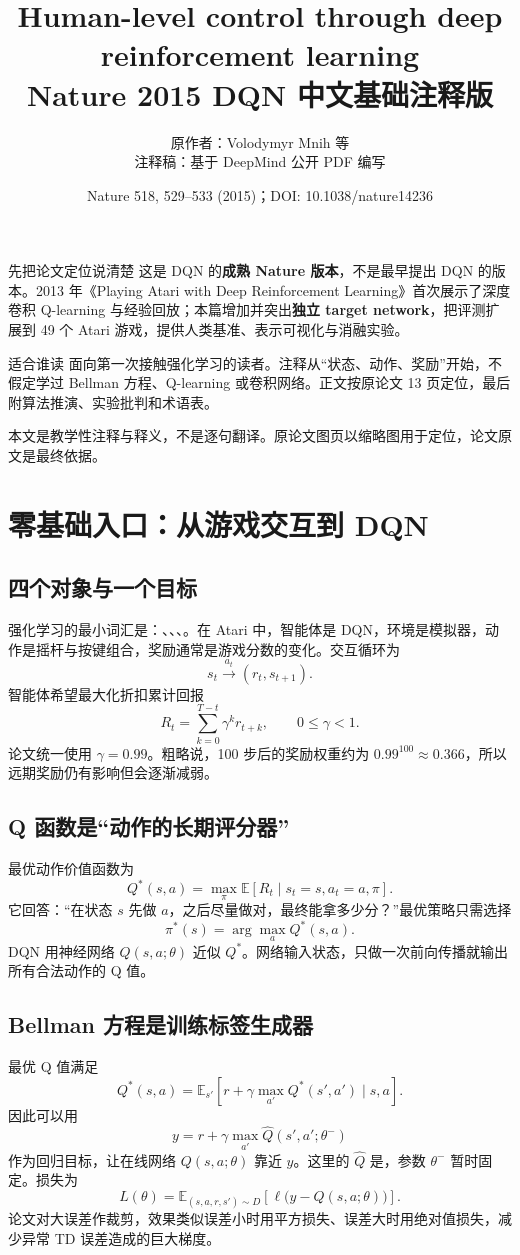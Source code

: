 \documentclass[UTF8,11pt]{ctexart}
\title{\bfseries\Huge Human-level control through deep reinforcement learning\\[3mm]\Large Nature 2015 DQN 中文基础注释版}
\author{原作者：Volodymyr Mnih 等\\注释稿：基于 DeepMind 公开 PDF 编写}
\date{Nature 518, 529--533 (2015)；DOI: 10.1038/nature14236}
\begin{document}
\maketitle
\thispagestyle{empty}
\vfill
\begin{keybox}{先把论文定位说清楚}
这是 DQN 的\textbf{成熟 Nature 版本}，不是最早提出 DQN 的版本。2013 年《Playing Atari with Deep Reinforcement Learning》首次展示了深度卷积 Q-learning 与经验回放；本篇增加并突出\textbf{独立 target network}，把评测扩展到 49 个 Atari 游戏，提供人类基准、表示可视化与消融实验。
\end{keybox}
\begin{plainbox}{适合谁读}
面向第一次接触强化学习的读者。注释从“状态、动作、奖励”开始，不假定学过 Bellman 方程、Q-learning 或卷积网络。正文按原论文 13 页定位，最后附算法推演、实验批判和术语表。
\end{plainbox}
\vfill
\noindent\small 本文是教学性注释与释义，不是逐句翻译。原论文图页以缩略图用于定位，论文原文是最终依据。
\clearpage

\tableofcontents
\clearpage

\section{零基础入口：从游戏交互到 DQN}

\subsection{四个对象与一个目标}
强化学习的最小词汇是：、、、。在 Atari 中，智能体是 DQN，环境是模拟器，动作是摇杆与按键组合，奖励通常是游戏分数的变化。交互循环为
\[
s_t \xrightarrow{a_t} (r_t,s_{t+1}).
\]
智能体希望最大化折扣累计回报
\[
R_t=\sum_{k=0}^{T-t}\gamma^k r_{t+k},\qquad 0\leq\gamma<1.
\]
论文统一使用 $\gamma=0.99$。粗略说，100 步后的奖励权重约为 $0.99^{100}\approx0.366$，所以远期奖励仍有影响但会逐渐减弱。

\subsection{Q 函数是“动作的长期评分器”}
最优动作价值函数为
\[
Q^*(s,a)=\max_\pi\mathbb E[R_t\mid s_t=s,a_t=a,\pi].
\]
它回答：“在状态 $s$ 先做 $a$，之后尽量做对，最终能拿多少分？”最优策略只需选择
\[
\pi^*(s)=\arg\max_a Q^*(s,a).
\]
DQN 用神经网络 $Q(s,a;\theta)$ 近似 $Q^*$。网络输入状态，只做一次前向传播就输出所有合法动作的 Q 值。

\subsection{Bellman 方程是训练标签生成器}
最优 Q 值满足
\[
Q^*(s,a)=\mathbb E_{s'}\left[r+\gamma\max_{a'}Q^*(s',a')\mid s,a\right].
\]
因此可以用
\[
y=r+\gamma\max_{a'}\widehat Q(s',a';\theta^-)
\]
作为回归目标，让在线网络 $Q(s,a;\theta)$ 靠近 $y$。这里的 $\widehat Q$ 是，参数 $\theta^-$ 暂时固定。损失为
\[
L(\theta)=\mathbb E_{(s,a,r,s')\sim D}\left[\ell\bigl(y-Q(s,a;\theta)\bigr)\right].
\]
论文对大误差作裁剪，效果类似误差小时用平方损失、误差大时用绝对值损失，减少异常 TD 误差造成的巨大梯度。
\end{document}
